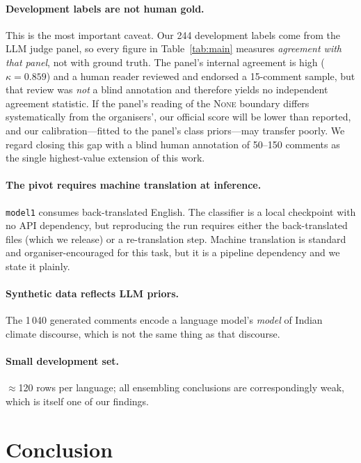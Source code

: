 \documentclass[twocolumn]{ceurart}
\begin{document}
\paragraph{Development labels are not human gold.}
This is the most important caveat. Our 244 development labels come from the
LLM judge panel, so every figure in Table~\ref{tab:main} measures
\emph{agreement with that panel}, not with ground truth. The panel's internal
agreement is high ($\kappa = 0.859$) and a human reader reviewed and endorsed a
15-comment sample, but that review was \emph{not} a blind annotation and
therefore yields no independent agreement statistic. If the panel's reading of
the \textsc{None} boundary differs systematically from the organisers', our
official score will be lower than reported, and our calibration---fitted to the
panel's class priors---may transfer poorly. We regard closing this gap with a
blind human annotation of 50--150 comments as the single highest-value
extension of this work.

\paragraph{The pivot requires machine translation at inference.}
\texttt{model1} consumes back-translated English. The classifier is a local
checkpoint with no API dependency, but reproducing the run requires either the
back-translated files (which we release) or a re-translation step. Machine
translation is standard and organiser-encouraged for this task, but it is a
pipeline dependency and we state it plainly.

\paragraph{Synthetic data reflects LLM priors.}
The 1\,040 generated comments encode a language model's \emph{model} of Indian
climate discourse, which is not the same thing as that discourse.

\paragraph{Small development set.}
$\approx$120 rows per language; all ensembling conclusions are correspondingly
weak, which is itself one of our findings.

\section{Conclusion}
\end{document}

